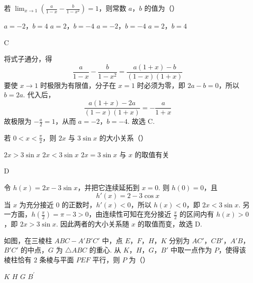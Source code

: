 \begin{problem}
若 \(\displaystyle\lim_{x\to 1}\left(\frac{a}{1 - x} - \frac{b}{1 - x^2}\right) = 1\)，则常数 \(a\)，\(b\) 的值为（\quad）

\choices
    {\(a = -2\)，\(b = 4\)}
    {\(a = 2\)，\(b = -4\)}
    {\(a = -2\)，\(b = -4\)}
    {\(a = 2\)，\(b = 4\)}
\end{problem}

\begin{answer}
C
\end{answer}

\begin{solution}
将式子通分，得
\[
\frac{a}{1-x}-\frac{b}{1-x^2}=\frac{a(1+x)-b}{(1-x)(1+x)}
\]
要使 \(x\to1\) 时极限为有限值，分子在 \(x=1\) 时必须为零，即 \(2a-b=0\)，所以 \(b=2a\). 代入后，
\[
\frac{a(1+x)-2a}{(1-x)(1+x)}=-\frac{a}{1+x}
\]
故极限为 \(-\frac{a}{2}=1\)，从而 \(a=-2\)，\(b=-4\). 故选 C.
\end{solution}

\begin{problem}
若 \(0 < x < \frac{\pi}{2}\)，则 \(2x\) 与 \(3\sin x\) 的大小关系（\quad）

\choices
    {\(2x > 3\sin x\)}
    {\(2x < 3\sin x\)}
    {\(2x = 3\sin x\)}
    {与 \(x\) 的取值有关}
\end{problem}

\begin{answer}
D
\end{answer}

\begin{solution}
令 \(h(x)=2x-3\sin x\)，并把它连续延拓到 \(x=0\). 则 \(h(0)=0\)，且
\[
h'(x)=2-3\cos x
\]
当 \(x\) 为充分接近 \(0\) 的正数时，\(h'(x)<0\)，所以 \(h(x)<0\)，即 \(2x<3\sin x\). 另一方面，\(h\left(\frac{\pi}{2}\right)=\pi-3>0\)，由连续性可知在充分接近 \(\frac{\pi}{2}\) 的区间内有 \(h(x)>0\)，即 \(2x>3\sin x\). 因此两者的大小关系随 \(x\) 的取值而变，故选 D.
\end{solution}

\begin{problem}
如图，在三棱柱 \(ABC - A'B'C'\) 中，点 \(E\)，\(F\)，\(H\)，\(K\) 分别为 \(AC'\)，\(CB'\)，\(A'B\)，\(B'C'\) 的中点，\(G\) 为 \(\triangle ABC\) 的重心. 从 \(K\)，\(H\)，\(G\)，\(B'\) 中取一点作为 \(P\)，使得该棱柱恰有 \(2\) 条棱与平面 \(PEF\) 平行，则 \(P\) 为（\quad）


\choices
    {\(K\)}
    {\(H\)}
    {\(G\)}
    {\(B^{\prime}\)}
\end{problem}

